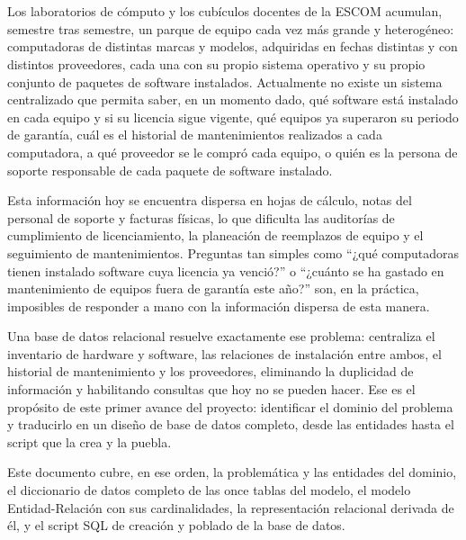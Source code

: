 \documentclass[10pt,a4paper]{article}
\begin{document}
\pagebreak

\section{\color{colorIPN}{Introducción}}

Los laboratorios de cómputo y los cubículos docentes de la ESCOM acumulan, semestre tras semestre, un parque de equipo cada vez más grande y heterogéneo: computadoras de distintas marcas y modelos, adquiridas en fechas distintas y con distintos proveedores, cada una con su propio sistema operativo y su propio conjunto de paquetes de software instalados. Actualmente no existe un sistema centralizado que permita saber, en un momento dado, qué software está instalado en cada equipo y si su licencia sigue vigente, qué equipos ya superaron su periodo de garantía, cuál es el historial de mantenimientos realizados a cada computadora, a qué proveedor se le compró cada equipo, o quién es la persona de soporte responsable de cada paquete de software instalado.

Esta información hoy se encuentra dispersa en hojas de cálculo, notas del personal de soporte y facturas físicas, lo que dificulta las auditorías de cumplimiento de licenciamiento, la planeación de reemplazos de equipo y el seguimiento de mantenimientos. Preguntas tan simples como \enquote{¿qué computadoras tienen instalado software cuya licencia ya venció?} o \enquote{¿cuánto se ha gastado en mantenimiento de equipos fuera de garantía este año?} son, en la práctica, imposibles de responder a mano con la información dispersa de esta manera.

Una base de datos relacional resuelve exactamente ese problema: centraliza el inventario de hardware y software, las relaciones de instalación entre ambos, el historial de mantenimiento y los proveedores, eliminando la duplicidad de información y habilitando consultas que hoy no se pueden hacer. Ese es el propósito de este primer avance del proyecto: identificar el dominio del problema y traducirlo en un diseño de base de datos completo, desde las entidades hasta el script que la crea y la puebla.

Este documento cubre, en ese orden, la problemática y las entidades del dominio, el diccionario de datos completo de las once tablas del modelo, el modelo Entidad-Relación con sus cardinalidades, la representación relacional derivada de él, y el script SQL de creación y poblado de la base de datos.
\end{document}

